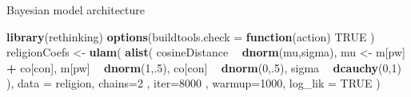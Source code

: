 \documentclass[10pt,ignorenonframetext,x11names, dvipsnames, bibspacing,natbib]{beamer}
\newenvironment{Shaded}{\begin{snugshade}}{\end{snugshade}}
\newcommand{\ControlFlowTok}[1]{\textcolor[rgb]{0.13,0.29,0.53}{\textbf{#1}}}
\newcommand{\DataTypeTok}[1]{\textcolor[rgb]{0.13,0.29,0.53}{#1}}
\newcommand{\DecValTok}[1]{\textcolor[rgb]{0.00,0.00,0.81}{#1}}
\newcommand{\KeywordTok}[1]{\textcolor[rgb]{0.13,0.29,0.53}{\textbf{#1}}}
\newcommand{\NormalTok}[1]{#1}
\newcommand{\OperatorTok}[1]{\textcolor[rgb]{0.81,0.36,0.00}{\textbf{#1}}}
\newcommand{\OtherTok}[1]{\textcolor[rgb]{0.56,0.35,0.01}{#1}}
\newcommand{\StringTok}[1]{\textcolor[rgb]{0.31,0.60,0.02}{#1}}
\begin{document}
\begin{frame}[fragile]{Bayesian model architecture}
\protect\hypertarget{bayesian-model-architecture-1}{}

\vspace{1mm}
\footnotesize

\begin{Shaded}
\begin{Highlighting}[]
\KeywordTok{library}\NormalTok{(rethinking)}
\KeywordTok{options}\NormalTok{(}\DataTypeTok{buildtools.check =} \ControlFlowTok{function}\NormalTok{(action) }\OtherTok{TRUE}\NormalTok{ )}
\NormalTok{religionCoefs <-}\StringTok{ }\KeywordTok{ulam}\NormalTok{(}
  \KeywordTok{alist}\NormalTok{(}
\NormalTok{    cosineDistance }\OperatorTok{~}\StringTok{ }\KeywordTok{dnorm}\NormalTok{(mu,sigma),}
\NormalTok{    mu <-}\StringTok{ }\NormalTok{m[pw] }\OperatorTok{+}\StringTok{ }\NormalTok{co[con],}
\NormalTok{    m[pw] }\OperatorTok{~}\StringTok{ }\KeywordTok{dnorm}\NormalTok{(}\DecValTok{1}\NormalTok{,.}\DecValTok{5}\NormalTok{),}
\NormalTok{    co[con] }\OperatorTok{~}\StringTok{ }\KeywordTok{dnorm}\NormalTok{(}\DecValTok{0}\NormalTok{,.}\DecValTok{5}\NormalTok{),}
\NormalTok{    sigma }\OperatorTok{~}\StringTok{ }\KeywordTok{dcauchy}\NormalTok{(}\DecValTok{0}\NormalTok{,}\DecValTok{1}\NormalTok{)}
\NormalTok{  ),}
  \DataTypeTok{data =}\NormalTok{ religion,}
  \DataTypeTok{chains=}\DecValTok{2}\NormalTok{ , }\DataTypeTok{iter=}\DecValTok{8000}\NormalTok{ , }\DataTypeTok{warmup=}\DecValTok{1000}\NormalTok{, }
  \DataTypeTok{log_lik =} \OtherTok{TRUE}
\NormalTok{)}
\end{Highlighting}
\end{Shaded}

\normalsize

\end{frame}
\end{document}
